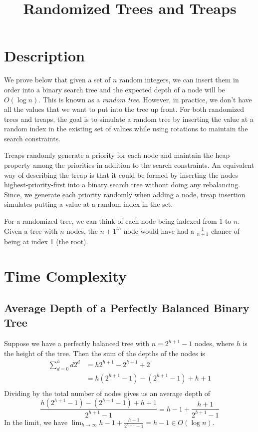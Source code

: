\documentclass[12pt]{article}
\begin{document}
\title{Randomized Trees and Treaps}
\author{}
\maketitle


\section*{Description}
We prove below that given a set of $n$ random integers, we can insert them in order into a binary search tree and the expected depth of a node will be $O(\log n)$. This is known as a \emph{random tree}. However, in practice, we don't have all the values that we want to put into the tree up front. For both randomized trees and treaps, the goal is to simulate a random tree by inserting the value at a random index in the existing set of values while using rotations to maintain the search constraints.

Treaps randomly generate a priority for each node and maintain the heap property among the priorities in addition to the search constraints. An equivalent way of describing the treap is that it could be formed by inserting the nodes highest-priority-first into a binary search tree without doing any rebalancing. Since, we generate each priority randomly when adding a node, treap insertion simulates putting a value at a random index in the set.

For a randomized tree, we can think of each node being indexed from 1 to $n$. Given a tree with $n$ nodes, the $n+1^{th}$ node would have had a $\frac{1}{n+1}$ chance of being at index 1 (the root).


\section*{Time Complexity}

\subsection*{Average Depth of a Perfectly Balanced Binary Tree}
Suppose we have a perfectly balanced tree with $n = 2^{h+1} - 1$ nodes, where $h$ is the height of the tree. Then the sum of the depths of the nodes is
\begin{align*}
  \sum_{d=0}^h d 2^d &= h 2^{h+1} - 2^{h+1} + 2 \\
  &= h(2^{h+1} - 1) - (2^{h+1} - 1) + h + 1 \\
\end{align*}
Dividing by the total number of nodes gives us an average depth of
\[ \frac{h(2^{h+1} - 1) - (2^{h+1} - 1) + h + 1}{2^{h+1} - 1} = h - 1 + \frac{h+1}{2^{h+1} - 1} \]
In the limit, we have $\lim_{h \rightarrow \infty} h - 1 + \frac{h+1}{2^{h+1} - 1} = h - 1 \in O(\log n)$.
\end{document}
